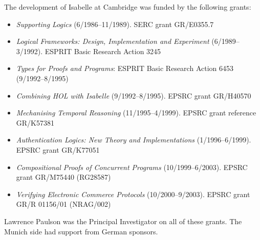 \documentclass[11pt]{article}
\begin{document}
The development of Isabelle at Cambridge was funded by the following grants:
\begin{itemize}
\item \emph{Supporting Logics} (6/1986--11/1989). SERC grant GR/E0355.7
\item \emph{Logical Frameworks: Design, Implementation and Experiment} (6/1989--3/1992). ESPRIT Basic Research Action 3245
\item \emph{Types for Proofs and Programs}: ESPRIT Basic Research Action 6453 (9/1992--8/1995) 
\item \emph{Combining HOL with Isabelle} (9/1992--8/1995). EPSRC grant GR/H40570
\item \emph{Mechanising Temporal Reasoning} (11/1995--4/1999). EPSRC grant reference GR/K57381
\item \emph{Authentication Logics: New Theory and Implementations} (1/1996--6/1999). EPSRC grant GR/K77051
\item \emph{Compositional Proofs of Concurrent Programs} (10/1999--6/2003). EPSRC grant GR/M75440 (RG28587)
\item \emph{Verifying Electronic Commerce Protocols} (10/2000--9/2003). EPSRC grant GR/R 01156/01 (NRAG/002)
\end{itemize}
Lawrence Paulson was the Principal Investigator on all of these grants.
The Munich side had support from German sponsors.

 \footnotesize\raggedright\frenchspacing

\end{document}
